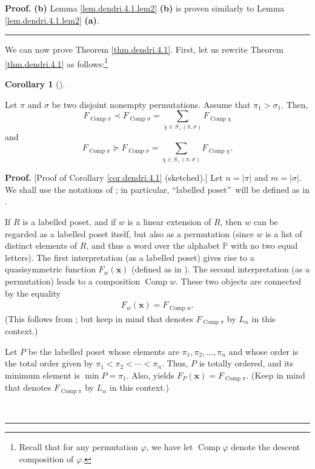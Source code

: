 \documentclass[numbers=enddot,12pt,final,onecolumn,notitlepage]{scrartcl}%
\theoremstyle{definition}
\newtheorem{coro}[theo]{Corollary}
\newenvironment{corollary}[1][]
{\begin{coro}[#1]\begin{leftbar}}
{\end{leftbar}\end{coro}}
\newenvironment{proof}[1][Proof]{\noindent\textbf{#1.} }{\ \rule{0.5em}{0.5em}}
\newenvironment{verlong}{}{}
\newcommand{\xx}{\mathbf{x}}
\let\sumnonlimits\sum
\renewcommand{\sum}{\sumnonlimits\limits}
\begin{document}
\begin{verlong}
\begin{proof}
\textbf{(b)} Lemma \ref{lem.dendri.4.1.lem2} \textbf{(b)} is proven similarly
to Lemma \ref{lem.dendri.4.1.lem2} \textbf{(a)}.
\end{proof}

We can now prove Theorem \ref{thm.dendri.4.1}.
First, let us rewrite Theorem \ref{thm.dendri.4.1} as follows:\footnote{Recall
that for any permutation $\varphi$, we have let $\operatorname*{Comp}\varphi$
denote the descent composition of $\varphi$.}

\begin{corollary}
\label{cor.dendri.4.1}Let $\pi$ and $\sigma$ be two disjoint nonempty
permutations. Assume that $\pi_{1}>\sigma_{1}$. Then,%
\[
F_{\operatorname*{Comp}\pi}\left.  \prec\right.  F_{\operatorname*{Comp}%
\sigma}=\sum_{\chi\in S_{\prec}\left(  \pi,\sigma\right)  }%
F_{\operatorname*{Comp}\chi}%
\]
and%
\[
F_{\operatorname*{Comp}\pi}\left.  \succeq\right.  F_{\operatorname*{Comp}%
\sigma}=\sum_{\chi\in S_{\succ}\left(  \pi,\sigma\right)  }%
F_{\operatorname*{Comp}\chi}.
\]

\end{corollary}

\begin{proof}
[Proof of Corollary \ref{cor.dendri.4.1} (sketched).] Let $n=\left\vert
\pi\right\vert $ and $m=\left\vert \sigma\right\vert $. We shall use the
notations of \cite[Section 5.2]{HopfComb}; in particular,
\textquotedblleft labelled poset\textquotedblright\ will be defined as in
\cite[Definition 5.2.1]{HopfComb}.

If $R$ is a labelled poset, and if $w$ is a linear extension of $R$,
then $w$ can be regarded as a labelled poset itself, but also as a
permutation (since $w$ is a list of distinct elements of $R$, and thus
a word over the alphabet $\mathbb{P}$ with no two equal letters).
The first interpretation (as a labelled poset)
gives rise to a quasisymmetric function
$F_w\left(\xx\right)$ (defined as in \cite[Definition 5.2.1]{HopfComb}).
The second interpretation (as a permutation) leads to a composition
$\operatorname{Comp} w$. These two objects are connected by the equality
\begin{align}
F_w \left( \xx \right) = F_{\operatorname{Comp} w} .
\label{pf.cor.dendri.4.1.Fw}
\end{align}
(This follows from \cite[Proposition 5.2.10]{HopfComb}; but keep in mind that
\cite[Proposition 5.2.10]{HopfComb} denotes $F_{\operatorname*{Comp}\pi}$
by $L_{\alpha}$ in this context.)

Let $P$ be the labelled poset whose elements are $\pi_{1},\pi_{2},\ldots
,\pi_{n}$ and whose order is the total order given by $\pi_{1}<\pi_{2}%
<\cdots<\pi_{n}$. Thus, $P$ is totally ordered, and its minimum element is
$\min P=\pi_{1}$. Also, \cite[Proposition 5.2.10]{HopfComb} yields
$F_{P}\left(  \mathbf{x}\right)  =F_{\operatorname*{Comp}\pi}$. (Keep in mind
that \cite[Proposition 5.2.10]{HopfComb} denotes $F_{\operatorname*{Comp}\pi}$
by $L_{\alpha}$ in this context.)


\end{proof}
\end{verlong}
\end{document}

